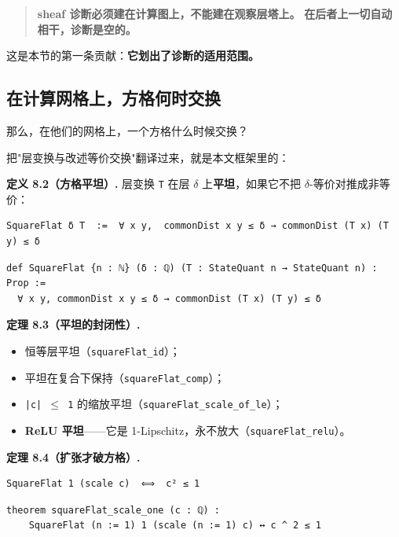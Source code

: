 \documentclass[11pt,a4paper]{ctexart}
\begin{document}
\begin{quote}
\textbf{sheaf 诊断必须建在计算图上，不能建在观察层塔上。} \textbf{在后者上一切自动相干，诊断是空的。}
\end{quote}

这是本节的第一条贡献：\textbf{它划出了诊断的适用范围。}

\subsection{在计算网格上，方格何时交换}

那么，在他们的网格上，一个方格什么时候交换？

把"层变换与改述等价交换"翻译过来，就是本文框架里的：

\textbf{定义 8.2（方格平坦）.} 层变换 \texttt{T} 在层 \texttt{\ensuremath{\delta}} 上\textbf{平坦}，如果它不把 \ensuremath{\delta}-等价对推成非等价：

\begin{lstlisting}
SquareFlat δ T  :=  ∀ x y,  commonDist x y ≤ δ → commonDist (T x) (T y) ≤ δ
\end{lstlisting}

\begin{lstlisting}
def SquareFlat {n : ℕ} (δ : ℚ) (T : StateQuant n → StateQuant n) : Prop :=
  ∀ x y, commonDist x y ≤ δ → commonDist (T x) (T y) ≤ δ
\end{lstlisting}

\textbf{定理 8.3（平坦的封闭性）.}

\begin{itemize}
\item 恒等层平坦（\texttt{squareFlat\_id}）；
\item 平坦在复合下保持（\texttt{squareFlat\_comp}）；
\item \texttt{|c| \ensuremath{\le} 1} 的缩放平坦（\texttt{squareFlat\_scale\_of\_le}）；
\item \textbf{ReLU 平坦}——它是 1-Lipschitz，永不放大（\texttt{squareFlat\_relu}）。
\end{itemize}

\textbf{定理 8.4（扩张才破方格）.}

\begin{lstlisting}
SquareFlat 1 (scale c)  ⟺  c² ≤ 1
\end{lstlisting}

\begin{lstlisting}
theorem squareFlat_scale_one (c : ℚ) :
    SquareFlat (n := 1) 1 (scale (n := 1) c) ↔ c ^ 2 ≤ 1
\end{lstlisting}
\end{document}
